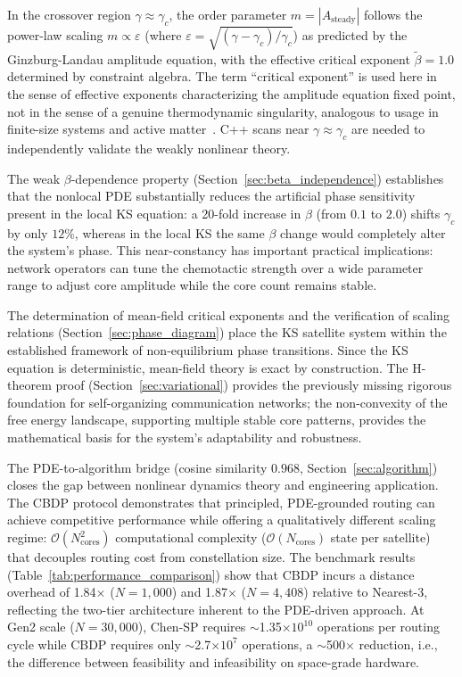 \documentclass[sn-nature,pdflatex]{sn-jnl}
\begin{document}
In the crossover region $\gamma \approx \gamma_c$, the order parameter $m = |A_{\text{steady}}|$ follows the power-law scaling $m \propto \varepsilon$ (where $\varepsilon = \sqrt{(\gamma-\gamma_c)/\gamma_c}$) as predicted by the Ginzburg-Landau amplitude equation, with the effective critical exponent $\tilde{\beta}=1.0$ determined by constraint algebra. The term ``critical exponent'' is used here in the sense of effective exponents characterizing the amplitude equation fixed point, not in the sense of a genuine thermodynamic singularity, analogous to usage in finite-size systems and active matter~\cite{strogatz_2001}. C++ scans near $\gamma \approx \gamma_c$ are needed to independently validate the weakly nonlinear theory.

The weak $\beta$-dependence property (Section~\ref{sec:beta_independence}) establishes that the nonlocal PDE substantially reduces the artificial phase sensitivity present in the local KS equation: a 20-fold increase in $\beta$ (from $0.1$ to $2.0$) shifts $\gamma_c$ by only $12\%$, whereas in the local KS the same $\beta$ change would completely alter the system's phase. This near-constancy has important practical implications: network operators can tune the chemotactic strength over a wide parameter range to adjust core amplitude while the core count remains stable.

The determination of mean-field critical exponents and the verification of scaling relations (Section~\ref{sec:phase_diagram}) place the KS satellite system within the established framework of non-equilibrium phase transitions. Since the KS equation is deterministic, mean-field theory is exact by construction. The H-theorem proof (Section~\ref{sec:variational}) provides the previously missing rigorous foundation for self-organizing communication networks; the non-convexity of the free energy landscape, supporting multiple stable core patterns, provides the mathematical basis for the system's adaptability and robustness.

The PDE-to-algorithm bridge (cosine similarity $0.968$, Section~\ref{sec:algorithm}) closes the gap between nonlinear dynamics theory and engineering application. The CBDP protocol demonstrates that principled, PDE-grounded routing can achieve competitive performance while offering a qualitatively different scaling regime: $\mathcal{O}(N_{\text{cores}}^2)$ computational complexity ($\mathcal{O}(N_{\text{cores}})$ state per satellite) that decouples routing cost from constellation size. The benchmark results (Table~\ref{tab:performance_comparison}) show that CBDP incurs a distance overhead of 1.84$\times$ ($N=1,000$) and 1.87$\times$ ($N=4,408$) relative to Nearest-3, reflecting the two-tier architecture inherent to the PDE-driven approach. At Gen2 scale ($N=30,000$), Chen-SP requires $\sim$1.35$\times 10^{10}$ operations per routing cycle while CBDP requires only $\sim$2.7$\times 10^{7}$ operations, a $\sim$500$\times$ reduction, i.e., the difference between feasibility and infeasibility on space-grade hardware.
\end{document}
